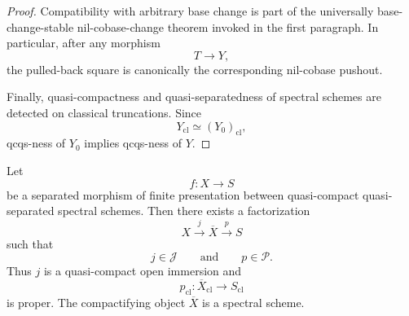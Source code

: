 \begin{proof}
Compatibility with arbitrary base change is part of the universally
base-change-stable nil-cobase-change theorem invoked in the first paragraph.
In particular, after any morphism
\[
    T\longrightarrow Y,
\]
the pulled-back square is canonically the corresponding nil-cobase pushout.

Finally, quasi-compactness and quasi-separatedness of spectral schemes are
detected on classical truncations.  Since
\[
    Y_{\mathrm{cl}}
    \simeq
    (Y_0)_{\mathrm{cl}},
\]
qcqs-ness of \(Y_0\) implies qcqs-ness of \(Y\).
\end{proof}

\begin{theorem}
\label{thm:spectral-nagata-compactification}
Let
\[
    f:X\longrightarrow S
\]
be a separated morphism of finite presentation between quasi-compact
quasi-separated spectral schemes.  Then there exists a factorization
\[
    X
    \xrightarrow{j}
    \overline X
    \xrightarrow{p}
    S
\]
such that
\[
    j\in\mathcal J
    \qquad\text{and}\qquad
    p\in\mathcal P.
\]
Thus \(j\) is a quasi-compact open immersion and
\[
    p_{\mathrm{cl}}:
    \overline X_{\mathrm{cl}}
    \longrightarrow
    S_{\mathrm{cl}}
\]
is proper.  The compactifying object \(\overline X\) is a spectral scheme.
\end{theorem}

